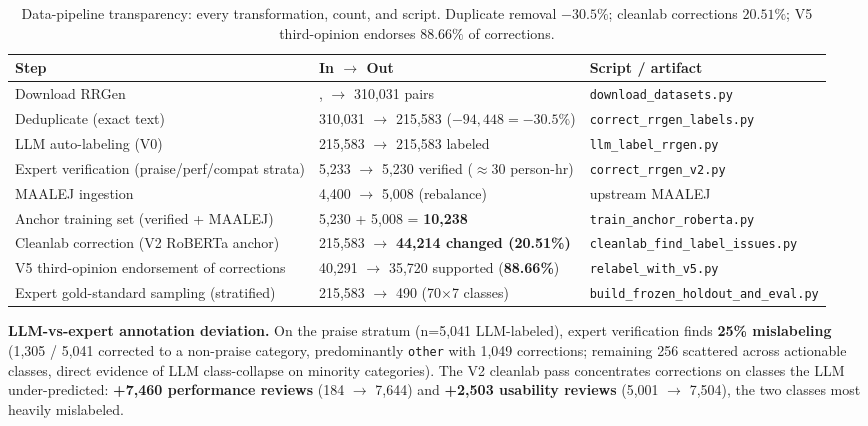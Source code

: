 \documentclass[sigconf, nonacm, anonymous, balance=false]{acmart}
\begin{document}
\begin{table}[t]\centering\footnotesize\setlength{\tabcolsep}{2pt}
\caption{Data-pipeline transparency: every transformation, count, and script. Duplicate removal $-30.5\%$; cleanlab corrections $20.51\%$; V5 third-opinion endorses $88.66\%$ of corrections.}\label{tab:data-stats}
\begin{tabular}{p{2.6cm}p{1.6cm}p{2.4cm}}\toprule
Step & In $\to$ Out & Script / artifact \\\midrule
Download RRGen &, $\to$ 310,031 pairs & \texttt{download\_datasets.py} \\
Deduplicate (exact text) & 310,031 $\to$ 215,583 ($-94{,}448 = -30.5\%$) & \texttt{correct\_rrgen\_labels.py} \\
LLM auto-labeling (V0) & 215,583 $\to$ 215,583 labeled & \texttt{llm\_label\_rrgen.py} \\
Expert verification (praise/perf/compat strata) & 5,233 $\to$ 5,230 verified ($\approx$30 person-hr) & \texttt{correct\_rrgen\_v2.py} \\
MAALEJ ingestion & 4,400 $\to$ 5,008 (rebalance) & upstream MAALEJ \cite{maalej2016} \\
Anchor training set (verified + MAALEJ) & 5,230 + 5,008 = \textbf{10,238} & \texttt{train\_anchor\_roberta.py} \\
Cleanlab correction (V2 RoBERTa anchor) & 215,583 $\to$ \textbf{44,214 changed (20.51\%)} & \texttt{cleanlab\_find\_label\_issues.py} \\
V5 third-opinion endorsement of corrections & 40,291 $\to$ 35,720 supported (\textbf{88.66\%}) & \texttt{relabel\_with\_v5.py} \\
Expert gold-standard sampling (stratified) & 215,583 $\to$ 490 (70$\times$7 classes) & \texttt{build\_frozen\_holdout\_and\_eval.py} \\
\bottomrule\end{tabular}\end{table}

\textbf{LLM-vs-expert annotation deviation.} On the praise stratum (n=5,041 LLM-labeled), expert verification finds \textbf{25\% mislabeling} (1,305 / 5,041 corrected to a non-praise category, predominantly \texttt{other} with 1,049 corrections; remaining 256 scattered across actionable classes, direct evidence of LLM class-collapse on minority categories). The V2 cleanlab pass concentrates corrections on classes the LLM under-predicted: \textbf{+7,460 performance reviews} (184 $\to$ 7,644) and \textbf{+2,503 usability reviews} (5,001 $\to$ 7,504), the two classes most heavily mislabeled.
\end{document}
